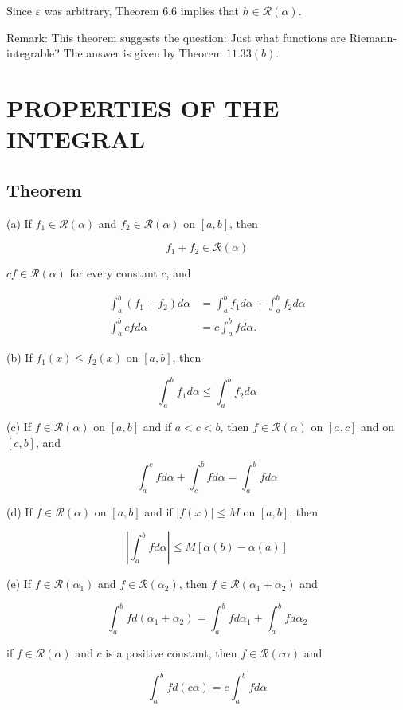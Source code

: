 \documentclass[10pt]{article}
\begin{document}
Since $\varepsilon$ was arbitrary, Theorem 6.6 implies that $h \in \mathscr{R}(\alpha)$.

Remark: This theorem suggests the question: Just what functions are Riemann-integrable? The answer is given by Theorem $11.33(b)$.

\section{PROPERTIES OF THE INTEGRAL}
\subsection{Theorem}
(a) If $f_{1} \in \mathscr{R}(\alpha)$ and $f_{2} \in \mathscr{R}(\alpha)$ on $[a, b]$, then

$$
f_{1}+f_{2} \in \mathscr{R}(\alpha)
$$

$c f \in \mathscr{R}(\alpha)$ for every constant $c$, and

$$
\begin{aligned}
\int_{a}^{b}\left(f_{1}+f_{2}\right) d \alpha & =\int_{a}^{b} f_{1} d \alpha+\int_{a}^{b} f_{2} d \alpha \\
\int_{a}^{b} c f d \alpha & =c \int_{a}^{b} f d \alpha .
\end{aligned}
$$

(b) If $f_{1}(x) \leq f_{2}(x)$ on $[a, b]$, then

$$
\int_{a}^{b} f_{1} d \alpha \leq \int_{a}^{b} f_{2} d \alpha
$$

(c) If $f \in \mathscr{R}(\alpha)$ on $[a, b]$ and if $a<c<b$, then $f \in \mathscr{R}(\alpha)$ on $[a, c]$ and on $[c, b]$, and

$$
\int_{a}^{c} f d \alpha+\int_{c}^{b} f d \alpha=\int_{a}^{b} f d \alpha
$$

(d) If $f \in \mathscr{R}(\alpha)$ on $[a, b]$ and if $|f(x)| \leq M$ on $[a, b]$, then

$$
\left|\int_{a}^{b} f d \alpha\right| \leq M[\alpha(b)-\alpha(a)]
$$

(e) If $f \in \mathscr{R}\left(\alpha_{1}\right)$ and $f \in \mathscr{R}\left(\alpha_{2}\right)$, then $f \in \mathscr{R}\left(\alpha_{1}+\alpha_{2}\right)$ and

$$
\int_{a}^{b} f d\left(\alpha_{1}+\alpha_{2}\right)=\int_{a}^{b} f d \alpha_{1}+\int_{a}^{b} f d \alpha_{2}
$$

if $f \in \mathscr{R}(\alpha)$ and $c$ is a positive constant, then $f \in \mathscr{R}(c \alpha)$ and

$$
\int_{a}^{b} f d(c \alpha)=c \int_{a}^{b} f d \alpha
$$
\end{document}
